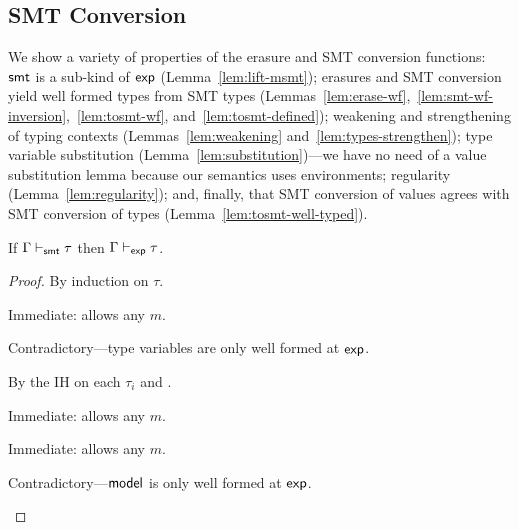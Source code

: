\documentclass[acmsmall,screen,nonacm]{acmart}
\theoremstyle{definition}
\begin{document}
\subsection{SMT Conversion}
\label{sec:metatheory-smt}

We show a variety of properties of the erasure and SMT conversion
functions:
%
$\mathsf{smt}$ is a sub-kind of $\mathsf{exp}$ (Lemma~\ref{lem:lift-msmt});
%
erasures and SMT conversion yield well formed types from SMT types
(Lemmas~\ref{lem:erase-wf},~\ref{lem:smt-wf-inversion},~\ref{lem:tosmt-wf},
and~\ref{lem:tosmt-defined});
%
weakening and strengthening of typing contexts (Lemmas~\ref{lem:weakening} and~\ref{lem:types-strengthen});
%
type variable substitution (Lemma~\ref{lem:substitution})---we have no
need of a value substitution lemma because our semantics uses
environments;
%
regularity (Lemma~\ref{lem:regularity});
%
and, finally, that SMT conversion of values agrees with SMT conversion
of types (Lemma~\ref{lem:tosmt-well-typed}).

\begin{lemma}
  \label{lem:lift-msmt}
%  
  If $\Gamma \vdash_{\mathsf{smt}} \tau$ then $\Gamma \vdash_{\mathsf{exp}} \tau$.
%
\begin{proof}
  By induction on $\tau$.
%
  \begin{proofcases}

  \item[($\tau=B$)] Immediate:  allows any $m$.
    
  \item[($\tau=\alpha$)] Contradictory---type variables are only well formed at $\mathsf{exp}$.
    
  \item[($\tau=D ~ \vec{\tau_i}$)] By the IH on each $\tau_i$ and .

  \item[($\tau=\smt{t}$)] Immediate:  allows any $m$.

  \item[($\tau=\sym{t}$)] Immediate:  allows any $m$.

  \item[($\tau=\MODEL$)] Contradictory---$\mathsf{model}$ is only well formed at $\mathsf{exp}$.
%
    \qedhere

  \end{proofcases}
\end{proof}
\end{lemma}
\end{document}
